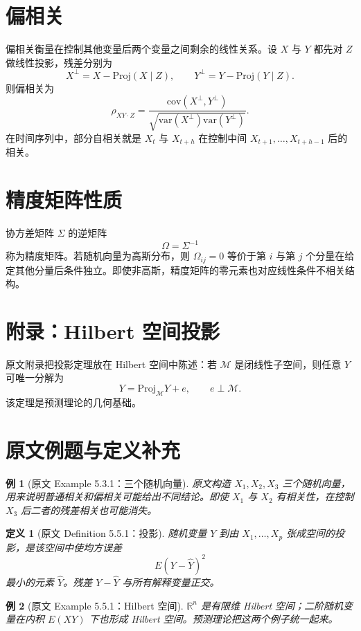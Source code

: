 \documentclass[11pt,a4paper,openany]{ctexbook}
\newtheorem{definition}{定义}[section]
\newtheorem{example}{例}[section]
\begin{document}
\section{偏相关}

偏相关衡量在控制其他变量后两个变量之间剩余的线性关系。设 \(X\) 与 \(Y\) 都先对 \(Z\) 做线性投影，残差分别为
\[
  X^\perp=X-\mathrm{Proj}(X\mid Z),\qquad
  Y^\perp=Y-\mathrm{Proj}(Y\mid Z).
\]
则偏相关为
\[
  \rho_{XY\cdot Z}
  =\frac{\mathrm{cov}(X^\perp,Y^\perp)}
  {\sqrt{\mathrm{var}(X^\perp)\mathrm{var}(Y^\perp)}}.
\]
在时间序列中，部分自相关就是 \(X_t\) 与 \(X_{t+h}\) 在控制中间 \(X_{t+1},\ldots,X_{t+h-1}\) 后的相关。

\section{精度矩阵性质}

协方差矩阵 \(\Sigma\) 的逆矩阵
\[
  \Omega=\Sigma^{-1}
\]
称为精度矩阵。若随机向量为高斯分布，则 \(\Omega_{ij}=0\) 等价于第 \(i\) 与第 \(j\) 个分量在给定其他分量后条件独立。即使非高斯，精度矩阵的零元素也对应线性条件不相关结构。

\section{附录：Hilbert 空间投影}

原文附录把投影定理放在 Hilbert 空间中陈述：若 \(\mathcal M\) 是闭线性子空间，则任意 \(Y\) 可唯一分解为
\[
  Y=\mathrm{Proj}_{\mathcal M}Y+e,
  \qquad e\perp \mathcal M.
\]
该定理是预测理论的几何基础。

\section{原文例题与定义补充}

\begin{example}[原文 Example 5.3.1：三个随机向量]
原文构造 \(X_1,X_2,X_3\) 三个随机向量，用来说明普通相关和偏相关可能给出不同结论。即使 \(X_1\) 与 \(X_2\) 有相关性，在控制 \(X_3\) 后二者的残差相关也可能消失。
\end{example}

\begin{definition}[原文 Definition 5.5.1：投影]
随机变量 \(Y\) 到由 \(X_1,\ldots,X_p\) 张成空间的投影，是该空间中使均方误差
\[
  E(Y-\hat Y)^2
\]
最小的元素 \(\hat Y\)。残差 \(Y-\hat Y\) 与所有解释变量正交。
\end{definition}

\begin{example}[原文 Example 5.5.1：Hilbert 空间]
\(\mathbb R^n\) 是有限维 Hilbert 空间；二阶随机变量在内积 \(E(XY)\) 下也形成 Hilbert 空间。预测理论把这两个例子统一起来。
\end{example}
\end{document}
